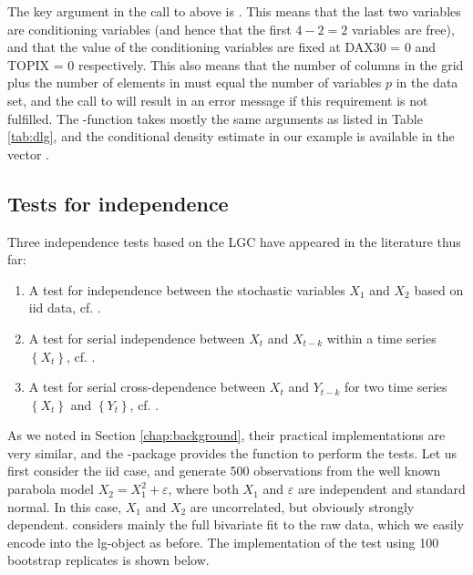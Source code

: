 The key argument in the call to  above is . This means that the last two variables are conditioning variables (and hence that the first \(4-2=2\) variables are free), and that the value of the conditioning variables are fixed at DAX30 = 0 and TOPIX = 0 respectively. This also means that the number of columns in the grid  plus the number of elements in  must equal the number of variables \(p\) in the data set, and the call to  will result in an error message if this requirement is not fulfilled. The -function takes mostly the same arguments as  listed in Table \ref{tab:dlg}, and the conditional density estimate in our example is available in the vector .

\subsection{Tests for independence}
\label{chap:indtests}

Three independence tests based on the LGC have appeared in the literature thus far:

\begin{enumerate}
\def\labelenumi{\arabic{enumi}.}
\item
  A test for independence between the stochastic variables \(X_1\) and \(X_2\) based on iid data, cf. \cite{bere:tjos:2014}.
\item
  A test for serial independence between \(X_t\) and \(X_{t-k}\) within a time series \(\left\{X_t\right\}\), cf. \cite{laca:tjos:2017}. 
\item
  A test for serial cross-dependence between \(X_t\) and \(Y_{t-k}\) for two time series \(\left\{X_t\right\}\) and \(\left\{Y_t\right\}\), cf. \cite{laca:tjos:2018}.
\end{enumerate}
As we noted in Section \ref{chap:background}, their practical implementations are very similar, and the -package provides the function  to perform the tests. Let us first consider the iid case, and generate 500 observations  from the well known parabola model \(X_2 = X_1^2 + \varepsilon\), where both \(X_1\) and \(\varepsilon\) are independent and standard normal. In this case, \(X_1\) and \(X_2\) are uncorrelated, but obviously strongly dependent. \cite{bere:tjos:2014} considers mainly the full bivariate fit to the raw data, which we easily encode into the lg-object as before. The implementation of the test using 100 bootstrap replicates is shown below.

